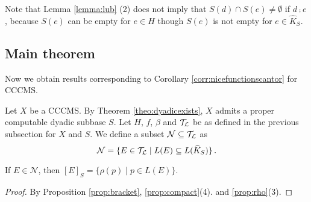\documentclass{eptcs-modified}
\begin{document}
Note that Lemma \ref{lemma:lub} (2) does not imply that
$S(d) \cap S(e) \ne \emptyset$ if $d \comp e$,
because
$S(e)$ can be empty for $e \in H$ though $S(e)$ is not empty for $e \in \widehat{K}_{S}$.

\subsection{Main theorem}

Now we obtain results corresponding to Corollary \ref{corr:nicefunctionscantor}  for CCCMS.


Let $X$ be a CCCMS.
By Theorem \ref{theo:dyadicexists}, $X$ admits a proper computable dyadic subbase $S$.  Let $H$, $f$, $\beta$
and $\mathcal{T}_\mathcal{L}$ be as defined in the previous subsection for $X$ and $S$.
We define a subset $\mathcal{N} \subseteq \mathcal{T}_\mathcal{L}$ as
\[\mathcal{N} = \{E \in \mathcal{T}_\mathcal{L} \mid L(E) \subseteq L(\widehat{K}_S)\}\,.\]


\begin{lemma}\label{lem:rhobracket}
  If $E \in {\mathcal N}$, then  $[E]_S = \{\rho(p) \mid p \in L(E)\}$.
\end{lemma}
\begin{proof}
  By Proposition \ref{prop:bracket},
  \ref{prop:compact}(4). and \ref{prop:rho}(3).
\end{proof}
\end{document}
